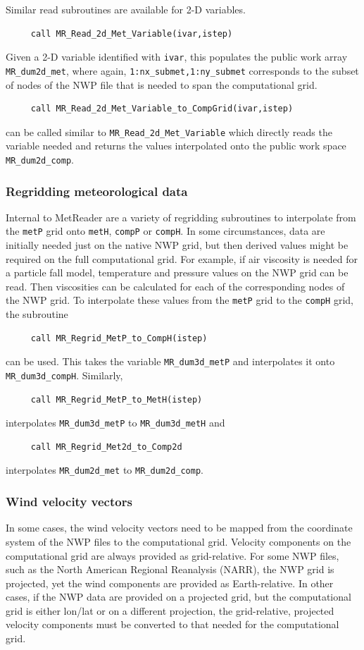\documentclass[11pt]{article}   %
\begin{document}
Similar read subroutines are available for 2-D variables.
\begin{verbatim}
     call MR_Read_2d_Met_Variable(ivar,istep)
\end{verbatim}
Given a 2-D variable identified with \texttt{ivar}, this populates the public
work array \texttt{MR\_dum2d\_met}, where again,
\texttt{1:nx\_submet,1:ny\_submet} corresponds to the subset of nodes of the NWP
file that is needed to span the computational grid.
\begin{verbatim}
     call MR_Read_2d_Met_Variable_to_CompGrid(ivar,istep)
\end{verbatim}
can be called similar to \texttt{MR\_Read\_2d\_Met\_Variable} which directly reads the
variable needed and returns the
values interpolated onto the public work space \texttt{MR\_dum2d\_comp}.

\subsubsection{Regridding meteorological data}
Internal to MetReader are a variety of regridding subroutines to interpolate from
the \texttt{metP} grid onto \texttt{metH}, \texttt{compP} or \texttt{compH}.  
In some circumstances, data are initially needed just on the native NWP grid, but
then derived values might be required on the full computational grid.
For example, if air viscosity is needed for a particle fall model, temperature and
pressure values on the NWP grid can be read.  Then viscosities can be calculated for each
of the corresponding nodes of the NWP grid.  To interpolate these values from the 
\texttt{metP} grid to the \texttt{compH} grid, the subroutine
\begin{verbatim}
     call MR_Regrid_MetP_to_CompH(istep)
\end{verbatim}
can be used.  This takes the variable \texttt{MR\_dum3d\_metP} and interpolates it
onto \texttt{MR\_dum3d\_compH}.  Similarly, 
\begin{verbatim}
     call MR_Regrid_MetP_to_MetH(istep)
\end{verbatim}
interpolates \texttt{MR\_dum3d\_metP} to \texttt{MR\_dum3d\_metH} and 
\begin{verbatim}
     call MR_Regrid_Met2d_to_Comp2d
\end{verbatim}
interpolates \texttt{MR\_dum2d\_met} to \texttt{MR\_dum2d\_comp}.


\subsubsection{Wind velocity vectors}
In some cases, the wind velocity vectors need to be mapped from the coordinate
system of the NWP files to the computational grid.  Velocity components on the
computational grid are always provided as grid-relative.  For some NWP files, such
as the North American Regional Reanalysis (NARR), the NWP grid is projected, yet
the wind components are provided as Earth-relative.  In other cases, if the NWP
data are provided on a projected grid, but the computational grid is either lon/lat
or on a different projection, the grid-relative, projected velocity components must
be converted to that needed for the computational grid.
\end{document}
